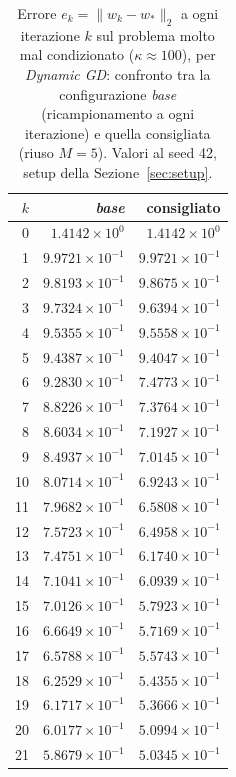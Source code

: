 \begin{table}[H]
\centering
\footnotesize
\renewcommand{\arraystretch}{0.85}
\setlength{\tabcolsep}{8pt}
\caption{Errore $e_k=\|w_k-w_*\|_2$ a ogni iterazione $k$ sul problema molto mal condizionato ($\kappa\approx 100$), per \emph{Dynamic GD}: confronto tra la configurazione \emph{base} (ricampionamento a ogni iterazione) e quella consigliata (riuso $M{=}5$). Valori al seed 42, setup della Sezione~\ref{sec:setup}.}
\label{tab:riuso_cons_veryill_gd}
\begin{tabular}{@{}rrr@{}}
\toprule
$k$ & \emph{base} & consigliato\\
\midrule
0 & $1.4142\times10^{0}$ & $1.4142\times10^{0}$\\
1 & $9.9721\times10^{-1}$ & $9.9721\times10^{-1}$\\
2 & $9.8193\times10^{-1}$ & $9.8675\times10^{-1}$\\
3 & $9.7324\times10^{-1}$ & $9.6394\times10^{-1}$\\
4 & $9.5355\times10^{-1}$ & $9.5558\times10^{-1}$\\
5 & $9.4387\times10^{-1}$ & $9.4047\times10^{-1}$\\
6 & $9.2830\times10^{-1}$ & $7.4773\times10^{-1}$\\
7 & $8.8226\times10^{-1}$ & $7.3764\times10^{-1}$\\
8 & $8.6034\times10^{-1}$ & $7.1927\times10^{-1}$\\
9 & $8.4937\times10^{-1}$ & $7.0145\times10^{-1}$\\
10 & $8.0714\times10^{-1}$ & $6.9243\times10^{-1}$\\
11 & $7.9682\times10^{-1}$ & $6.5808\times10^{-1}$\\
12 & $7.5723\times10^{-1}$ & $6.4958\times10^{-1}$\\
13 & $7.4751\times10^{-1}$ & $6.1740\times10^{-1}$\\
14 & $7.1041\times10^{-1}$ & $6.0939\times10^{-1}$\\
15 & $7.0126\times10^{-1}$ & $5.7923\times10^{-1}$\\
16 & $6.6649\times10^{-1}$ & $5.7169\times10^{-1}$\\
17 & $6.5788\times10^{-1}$ & $5.5743\times10^{-1}$\\
18 & $6.2529\times10^{-1}$ & $5.4355\times10^{-1}$\\
19 & $6.1717\times10^{-1}$ & $5.3666\times10^{-1}$\\
20 & $6.0177\times10^{-1}$ & $5.0994\times10^{-1}$\\
21 & $5.8679\times10^{-1}$ & $5.0345\times10^{-1}$\\

\end{tabular}
\end{table}
